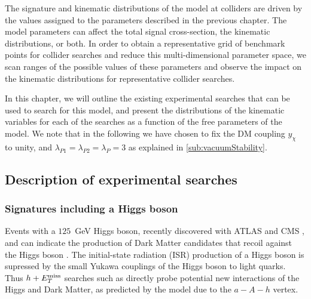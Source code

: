 The signature and kinematic distributions of the \hdma model at colliders are driven by the values assigned to the parameters described in the previous chapter. 
The model parameters can affect the total signal cross-section, the kinematic distributions, or both. 
In order to obtain a representative grid of benchmark points for collider searches and reduce this multi-dimensional parameter space, we scan ranges of the possible values of these parameters and observe the impact on the kinematic distributions for representative collider searches.


In this chapter, we will outline the existing experimental searches that can be used to search for this model, and present the distributions of the kinematic variables for each of the searches as a function of the free parameters of the model. 
We note that in the following we have chosen to fix the DM coupling  $y_\chi$ to unity, and $\lambda_{P1} = \lambda_{P2} = \lambda_P = 3$ as explained in \autoref{sub:vacuumStability}.  

\subsection{Description of experimental searches}

\subsubsection{Signatures including a Higgs boson}

Events with a  $125$~GeV Higgs boson, recently discovered with ATLAS and CMS \cite{Aad:2012tfa,Chatrchyan:2012xdj}, and \MET can indicate 
the production of Dark Matter candidates that recoil against the Higgs boson \cite{Carpenter:2013xra,Petrov:2013nia}. 
The initial-state radiation (ISR) production of a Higgs boson is supressed by the small Yukawa couplings of the Higgs boson to light quarks. Thus $h+E_T^\mathrm{miss}$ searches such as \cite{Aaboud:2017yqz,Aaboud:2017uak} 
directly probe potential new interactions of the Higgs and Dark Matter, as predicted by the \hdma model \cite{Bauer:2017ota,No:2015xqa} due to the $a-A-h$ vertex. 

 
